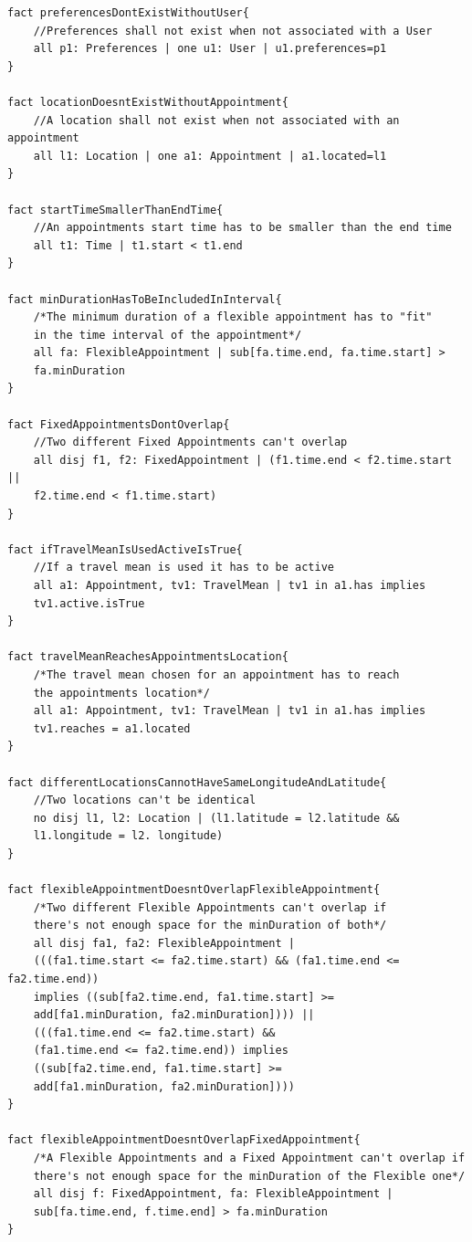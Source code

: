 \documentclass[12pt]{article}
\begin{document}
\begin{verbatim}
fact preferencesDontExistWithoutUser{
    //Preferences shall not exist when not associated with a User
    all p1: Preferences | one u1: User | u1.preferences=p1
}

fact locationDoesntExistWithoutAppointment{
    //A location shall not exist when not associated with an appointment
    all l1: Location | one a1: Appointment | a1.located=l1
}

fact startTimeSmallerThanEndTime{
    //An appointments start time has to be smaller than the end time
    all t1: Time | t1.start < t1.end
}

fact minDurationHasToBeIncludedInInterval{
    /*The minimum duration of a flexible appointment has to "fit" 
    in the time interval of the appointment*/
    all fa: FlexibleAppointment | sub[fa.time.end, fa.time.start] > 
    fa.minDuration
}

fact FixedAppointmentsDontOverlap{
    //Two different Fixed Appointments can't overlap
    all disj f1, f2: FixedAppointment | (f1.time.end < f2.time.start || 
    f2.time.end < f1.time.start)
}

fact ifTravelMeanIsUsedActiveIsTrue{
    //If a travel mean is used it has to be active
    all a1: Appointment, tv1: TravelMean | tv1 in a1.has implies 
    tv1.active.isTrue 
}

fact travelMeanReachesAppointmentsLocation{
    /*The travel mean chosen for an appointment has to reach 
    the appointments location*/
    all a1: Appointment, tv1: TravelMean | tv1 in a1.has implies 
    tv1.reaches = a1.located 
}

fact differentLocationsCannotHaveSameLongitudeAndLatitude{
    //Two locations can't be identical 
    no disj l1, l2: Location | (l1.latitude = l2.latitude && 
    l1.longitude = l2. longitude)
}

fact flexibleAppointmentDoesntOverlapFlexibleAppointment{
    /*Two different Flexible Appointments can't overlap if 
    there's not enough space for the minDuration of both*/
    all disj fa1, fa2: FlexibleAppointment | 
    (((fa1.time.start <= fa2.time.start) && (fa1.time.end <= fa2.time.end)) 
    implies ((sub[fa2.time.end, fa1.time.start] >= 
    add[fa1.minDuration, fa2.minDuration]))) ||
    (((fa1.time.end <= fa2.time.start) && 
    (fa1.time.end <= fa2.time.end)) implies
    ((sub[fa2.time.end, fa1.time.start] >= 
    add[fa1.minDuration, fa2.minDuration])))
}

fact flexibleAppointmentDoesntOverlapFixedAppointment{
    /*A Flexible Appointments and a Fixed Appointment can't overlap if
    there's not enough space for the minDuration of the Flexible one*/
    all disj f: FixedAppointment, fa: FlexibleAppointment |
    sub[fa.time.end, f.time.end] > fa.minDuration
}


\end{verbatim}
\end{document}
